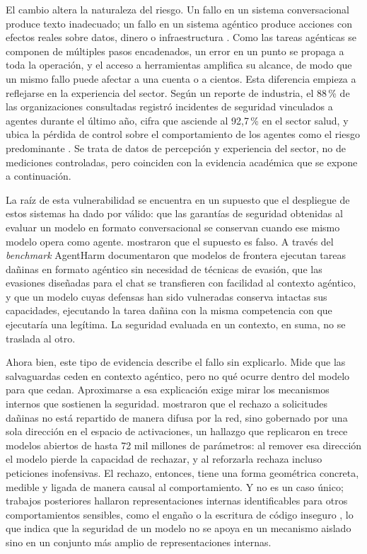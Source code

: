 \documentclass[12pt,a4paper]{article}
\newcommand{\parencite}[1]{\citep{#1}}
\newcommand{\textcite}[1]{\citet{#1}}
\begin{document}
El cambio altera la naturaleza del riesgo. Un fallo en un sistema conversacional produce texto inadecuado; un fallo en un sistema agéntico produce acciones con efectos reales sobre datos, dinero o infraestructura \parencite{andriushchenko2024}. Como las tareas agénticas se componen de múltiples pasos encadenados, un error en un punto se propaga a toda la operación, y el acceso a herramientas amplifica su alcance, de modo que un mismo fallo puede afectar a una cuenta o a cientos. Esta diferencia empieza a reflejarse en la experiencia del sector. Según un reporte de industria, el 88\,\% de las organizaciones consultadas registró incidentes de seguridad vinculados a agentes durante el último año, cifra que asciende al 92{,}7\,\% en el sector salud, y ubica la pérdida de control sobre el comportamiento de los agentes como el riesgo predominante \parencite{gravitee2026}. Se trata de datos de percepción y experiencia del sector, no de mediciones controladas, pero coinciden con la evidencia académica que se expone a continuación.

La raíz de esta vulnerabilidad se encuentra en un supuesto que el despliegue de estos sistemas ha dado por válido: que las garantías de seguridad obtenidas al evaluar un modelo en formato conversacional se conservan cuando ese mismo modelo opera como agente. \textcite{andriushchenko2024} mostraron que el supuesto es falso. A través del \textit{benchmark} AgentHarm documentaron que modelos de frontera ejecutan tareas dañinas en formato agéntico sin necesidad de técnicas de evasión, que las evasiones diseñadas para el chat se transfieren con facilidad al contexto agéntico, y que un modelo cuyas defensas han sido vulneradas conserva intactas sus capacidades, ejecutando la tarea dañina con la misma competencia con que ejecutaría una legítima. La seguridad evaluada en un contexto, en suma, no se traslada al otro.

Ahora bien, este tipo de evidencia describe el fallo sin explicarlo. Mide que las salvaguardas ceden en contexto agéntico, pero no qué ocurre dentro del modelo para que cedan. Aproximarse a esa explicación exige mirar los mecanismos internos que sostienen la seguridad. \textcite{arditi2024} mostraron que el rechazo a solicitudes dañinas no está repartido de manera difusa por la red, sino gobernado por una sola dirección en el espacio de activaciones, un hallazgo que replicaron en trece modelos abiertos de hasta 72 mil millones de parámetros: al remover esa dirección el modelo pierde la capacidad de rechazar, y al reforzarla rechaza incluso peticiones inofensivas. El rechazo, entonces, tiene una forma geométrica concreta, medible y ligada de manera causal al comportamiento. Y no es un caso único; trabajos posteriores hallaron representaciones internas identificables para otros comportamientos sensibles, como el engaño o la escritura de código inseguro \parencite{templeton2024}, lo que indica que la seguridad de un modelo no se apoya en un mecanismo aislado sino en un conjunto más amplio de representaciones internas.
\end{document}
